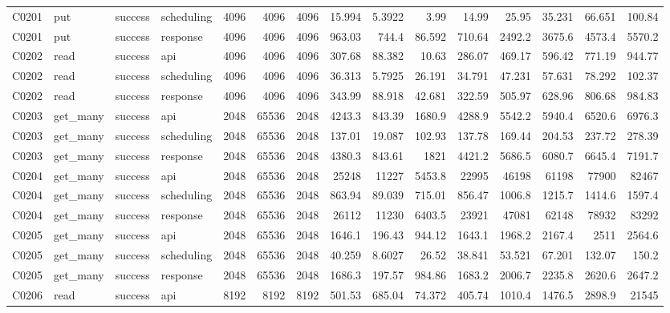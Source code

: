 \begin{landscape}
\begin{longtable}{llllrrrrrrrrrrr}
C0201 & put & success & scheduling & 4096 & 4096 & 4096 & 15.994 & 5.3922 & 3.99 & 14.99 & 25.95 & 35.231 & 66.651 & 100.84\\
C0201 & put & success & response & 4096 & 4096 & 4096 & 963.03 & 744.4 & 86.592 & 710.64 & 2492.2 & 3675.6 & 4573.4 & 5570.2\\
C0202 & read & success & api & 4096 & 4096 & 4096 & 307.68 & 88.382 & 10.63 & 286.07 & 469.17 & 596.42 & 771.19 & 944.77\\
C0202 & read & success & scheduling & 4096 & 4096 & 4096 & 36.313 & 5.7925 & 26.191 & 34.791 & 47.231 & 57.631 & 78.292 & 102.37\\
C0202 & read & success & response & 4096 & 4096 & 4096 & 343.99 & 88.918 & 42.681 & 322.59 & 505.97 & 628.96 & 806.68 & 984.83\\
C0203 & get\_\allowbreak{}many & success & api & 2048 & 65536 & 2048 & 4243.3 & 843.39 & 1680.9 & 4288.9 & 5542.2 & 5940.4 & 6520.6 & 6976.3\\
C0203 & get\_\allowbreak{}many & success & scheduling & 2048 & 65536 & 2048 & 137.01 & 19.087 & 102.93 & 137.78 & 169.44 & 204.53 & 237.72 & 278.39\\
C0203 & get\_\allowbreak{}many & success & response & 2048 & 65536 & 2048 & 4380.3 & 843.61 & 1821 & 4421.2 & 5686.5 & 6080.7 & 6645.4 & 7191.7\\
C0204 & get\_\allowbreak{}many & success & api & 2048 & 65536 & 2048 & 25248 & 11227 & 5453.8 & 22995 & 46198 & 61198 & 77900 & 82467\\
C0204 & get\_\allowbreak{}many & success & scheduling & 2048 & 65536 & 2048 & 863.94 & 89.039 & 715.01 & 856.47 & 1006.8 & 1215.7 & 1414.6 & 1597.4\\
C0204 & get\_\allowbreak{}many & success & response & 2048 & 65536 & 2048 & 26112 & 11230 & 6403.5 & 23921 & 47081 & 62148 & 78932 & 83292\\
C0205 & get\_\allowbreak{}many & success & api & 2048 & 65536 & 2048 & 1646.1 & 196.43 & 944.12 & 1643.1 & 1968.2 & 2167.4 & 2511 & 2564.6\\
C0205 & get\_\allowbreak{}many & success & scheduling & 2048 & 65536 & 2048 & 40.259 & 8.6027 & 26.52 & 38.841 & 53.521 & 67.201 & 132.07 & 150.2\\
C0205 & get\_\allowbreak{}many & success & response & 2048 & 65536 & 2048 & 1686.3 & 197.57 & 984.86 & 1683.2 & 2006.7 & 2235.8 & 2620.6 & 2647.2\\
C0206 & read & success & api & 8192 & 8192 & 8192 & 501.53 & 685.04 & 74.372 & 405.74 & 1010.4 & 1476.5 & 2898.9 & 21545\\

\end{longtable}
\end{landscape}
